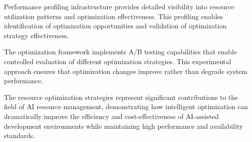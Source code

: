 Performance profiling infrastructure provides detailed visibility into resource utilization patterns and optimization effectiveness. This profiling enables identification of optimization opportunities and validation of optimization strategy effectiveness.

The optimization framework implements A/B testing capabilities that enable controlled evaluation of different optimization strategies. This experimental approach ensures that optimization changes improve rather than degrade system performance.

The resource optimization strategies represent significant contributions to the field of AI resource management, demonstrating how intelligent optimization can dramatically improve the efficiency and cost-effectiveness of AI-assisted development environments while maintaining high performance and availability standards.
